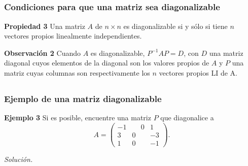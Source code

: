
\subsection{}

\begin{frame}\frametitle{Condiciones para que una matriz sea diagonalizable}
	
	\begin{prop}{\textbf{Propiedad 3}}
		\justifying
		Una matriz $A$ de $n\times n$ es diagonalizable si y sólo si tiene $n$ vectores propios 
		linealmente independientes.
	\end{prop}	
	
	\begin{alertblock}{\textbf{Observación 2}}\justifying
		Cuando $A$ es diagonalizable, $P^{-1}AP=D$, con $D$ una matriz diagonal cuyos elementos  
		de la diagonal son los valores propios de $A$ y $P$ una matriz cuyas columnas son 
		respectivamente los $n$ vectores propios LI de A.
	\end{alertblock}
	
\end{frame}


\subsection{}

\begin{frame}\frametitle{Ejemplo de una matriz diagonalizable}
			
	\begin{ej}{\textbf{Ejemplo 3}}
		Si es posible, encuentre una matriz $P$ que diagonalice a 
		\[
		A =
		\left(
		\begin{array}{rrr}
		-1 & \phantom{-}0 & 1 \\[1mm]
		 3 &            0 & -3 \\[1mm]
		 1 &            0 & -1
		\end{array}
		\right).
		\]	
	\end{ej}
	\textit{Solución.}
	
\end{frame}


